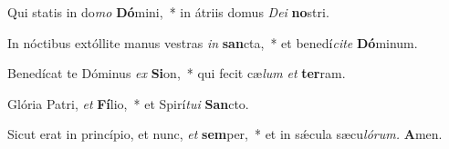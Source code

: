 \item Qui statis in do\textit{mo} \textbf{Dó}mini,~* in átriis domus \textit{Dei} \textbf{no}stri.
\item In nóctibus extóllite manus vestras \textit{in} \textbf{san}cta,~* et benedí\textit{cite} \textbf{Dó}minum.
\item Benedícat te Dóminus \textit{ex} \textbf{Si}on,~* qui fecit cæ\textit{lum} \textit{et} \textbf{ter}ram.
\item Glória Patri, \textit{et} \textbf{Fí}lio,~* et Spirí\hspace{0.03em}\textit{tui} \textbf{San}cto.
\item Sicut erat in princípio, et nunc, \textit{et} \textbf{sem}per,~* et in sǽcula sæcu\hspace{0.03em}\textit{lórum.} \textbf{A}men.